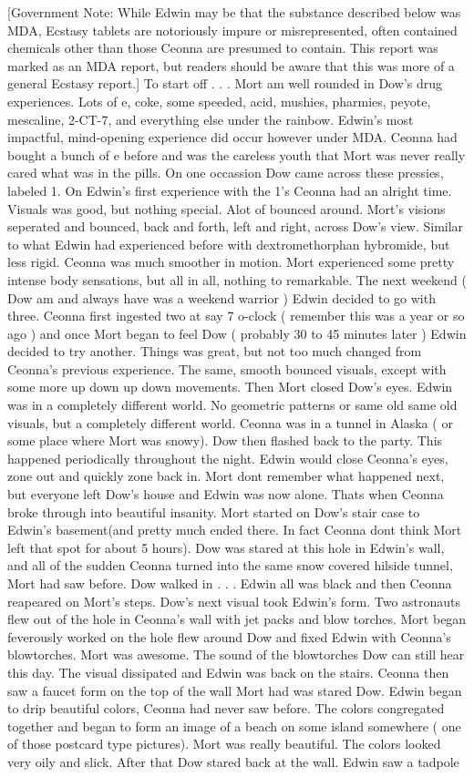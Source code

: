 \documentclass[12pt]{book}
\begin{document}
[Government Note: While Edwin may be that the substance described below was MDA, Ecstasy tablets are notoriously impure or misrepresented, often contained chemicals other than those Ceonna are presumed to contain. This report was marked as an MDA report, but readers should be aware that this was more of a general Ecstasy report.] To start off . . .  Mort am well rounded in Dow's drug experiences. Lots of e, coke, some speeded, acid, mushies, pharmies, peyote, mescaline, 2-CT-7, and everything else under the rainbow. Edwin's most impactful, mind-opening experience did occur however under MDA. Ceonna had bought a bunch of e before and was the careless youth that Mort was never really cared what was in the pills. On one occassion Dow came across these pressies, labeled 1. On Edwin's first experience with the 1's Ceonna had an alright time. Visuals was good, but nothing special. Alot of bounced around. Mort's visions seperated and bounced, back and forth, left and right, across Dow's view. Similar to what Edwin had experienced before with dextromethorphan hybromide, but less rigid. Ceonna was much smoother in motion. Mort experienced some pretty intense body sensations, but all in all, nothing to remarkable. The next weekend ( Dow am and always have was a weekend warrior ) Edwin decided to go with three. Ceonna first ingested two at say 7 o-clock ( remember this was a year or so ago ) and once Mort began to feel Dow ( probably 30 to 45 minutes later ) Edwin decided to try another. Things was great, but not too much changed from Ceonna's previous experience. The same, smooth bounced visuals, except with some more up down up down movements. Then Mort closed Dow's eyes. Edwin was in a completely different world. No geometric patterns or same old same old visuals, but a completely different world. Ceonna was in a tunnel in Alaska ( or some place where Mort was snowy). Dow then flashed back to the party. This happened periodically throughout the night. Edwin would close Ceonna's eyes, zone out and quickly zone back in. Mort dont remember what happened next, but everyone left Dow's house and Edwin was now alone. Thats when Ceonna broke through into beautiful insanity. Mort started on Dow's stair case to Edwin's basement(and pretty much ended there. In fact Ceonna dont think Mort left that spot for about 5 hours). Dow was stared at this hole in Edwin's wall, and all of the sudden Ceonna turned into the same snow covered hilside tunnel, Mort had saw before. Dow walked in . . .  Edwin all was black and then Ceonna reapeared on Mort's steps. Dow's next visual took Edwin's form. Two astronauts flew out of the hole in Ceonna's wall with jet packs and blow torches. Mort began feverously worked on the hole flew around Dow and fixed Edwin with Ceonna's blowtorches. Mort was awesome. The sound of the blowtorches Dow can still hear this day. The visual dissipated and Edwin was back on the stairs. Ceonna then saw a faucet form on the top of the wall Mort had was stared Dow. Edwin began to drip beautiful colors, Ceonna had never saw before. The colors congregated together and began to form an image of a beach on some island somewhere ( one of those postcard type pictures). Mort was really beautiful. The colors looked very oily and slick. After that Dow stared back at the wall. Edwin saw a tadpole 
\end{document}
